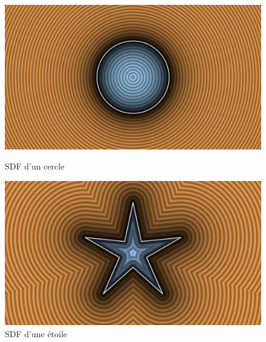 \begin{figure}[h]
  \begin{minipage}[b]{0.45\linewidth}
    \centering
    \includegraphics[width=\linewidth]{images/sdf/sdf_00.jpg}
    \caption{SDF d'un cercle}
    \label{sdf_00}
  \end{minipage}
  \hspace{0.1\linewidth} %
  \begin{minipage}[b]{0.45\linewidth}
    \centering
    \includegraphics[width=\linewidth]{images/sdf/sdf_01.jpg}
    \caption{SDF d'une étoile}
    \label{sdf_01}
  \end{minipage}
\end{figure}

